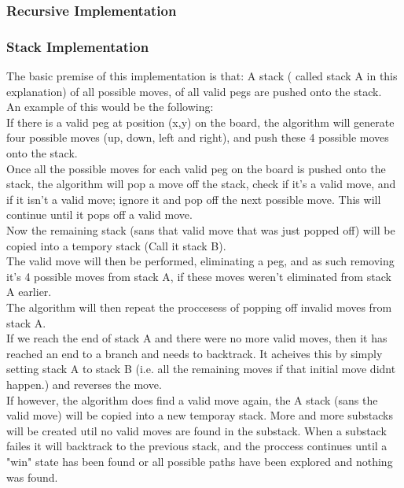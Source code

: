 \documentclass[a4paper]{article}
\begin{document}
\subsubsection{Recursive Implementation}

\subsubsection{Stack Implementation}
The basic premise of this implementation is that: A stack ( called stack A in this explanation) of all possible moves, of all valid pegs are pushed onto the stack.\\
An example of this would be the following:\\
If there is a valid peg at position (x,y) on the board, the algorithm will generate four possible moves (up, down, left and right), and push these 4 possible moves onto the stack.\\
Once all the possible moves for each valid peg on the board is pushed onto the stack, the algorithm will pop a move off the stack, check if it's a valid move, and if it isn't a valid move; ignore it and pop off the next possible move. This will continue until it pops off a valid move.\\
Now the remaining stack (sans that valid move that was just popped off) will be copied into a tempory stack (Call it stack B).\\
The valid move will then be performed, eliminating a peg, and as such removing it's 4 possible moves from stack A, if these moves weren't eliminated from stack A earlier.\\
The algorithm will then repeat  the proccesess of popping off invalid moves from stack A.\\
If we reach the end of stack A and there were no more valid moves, then it has reached an end to a branch and needs to backtrack. It acheives this by simply setting stack A to stack B (i.e. all the remaining moves if that initial move didnt happen.) and reverses the move.\\
If however, the algorithm does find a valid move again, the A stack (sans the valid move) will be copied into a new temporay stack. More and more substacks will be created util no valid moves are found in the substack. When a substack failes it will backtrack to the previous stack, and the proccess continues until a "win" state has been found or all possible paths have been explored and nothing was found.\\\
\end{document}
